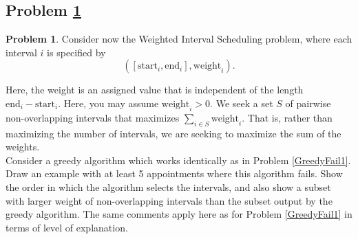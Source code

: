 \documentclass[11pt]{article}
\theoremstyle{definition}
\theoremstyle{definition}
\newtheorem{required}{Problem}
\theoremstyle{definition}
\begin{document}
\subsection{Problem \ref{GreedyFail3}}
\begin{required} \label{GreedyFail3}
Consider now the \textsf{Weighted Interval Scheduling} problem, where each interval $i$ is specified by 
\[
([\text{start}_{i}, \text{end}_{i}], \text{weight}_{i}). 
\]

\noindent Here, the weight is an assigned value that is independent of the length $\text{end}_{i} - \text{start}_{i}$. Here, you may assume $\text{weight}_{i} > 0$. We seek a set $S$ of pairwise non-overlapping intervals that maximizes $\sum_{i \in S} \text{weight}_{i}$. That is, rather than maximizing the number of intervals, we are seeking to maximize the sum of the weights. \\

\noindent Consider a greedy algorithm which works identically as in Problem \ref{GreedyFail1}. Draw an example with at least 5 appointments where this algorithm fails. Show the order in which the algorithm selects the intervals, and also show a subset with larger weight of non-overlapping intervals than the subset output by the greedy algorithm. The same comments apply here as for Problem \ref{GreedyFail1} in terms of level of explanation.
\end{required}
\end{document}
